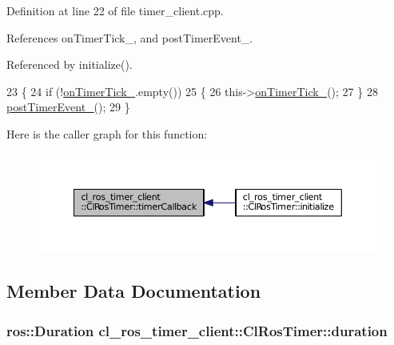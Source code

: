 Definition at line 22 of file timer\+\_\+client.\+cpp.



References on\+Timer\+Tick\+\_\+, and post\+Timer\+Event\+\_\+.



Referenced by initialize().


\begin{DoxyCode}
23 \{
24     \textcolor{keywordflow}{if} (!\hyperlink{classcl__ros__timer__client_1_1ClRosTimer_a2d37aff87ee978d4716966bf55d023b4}{onTimerTick\_}.empty())
25     \{
26         this->\hyperlink{classcl__ros__timer__client_1_1ClRosTimer_a2d37aff87ee978d4716966bf55d023b4}{onTimerTick\_}();
27     \}
28     \hyperlink{classcl__ros__timer__client_1_1ClRosTimer_a6fb47a4291370f5fefe61dd5123ed008}{postTimerEvent\_}();
29 \}
\end{DoxyCode}


Here is the caller graph for this function\+:
\nopagebreak
\begin{figure}[H]
\begin{center}
\leavevmode
\includegraphics[width=350pt]{classcl__ros__timer__client_1_1ClRosTimer_a1d1fd3574df7db302bcb3908d7ff15c8_icgraph}
\end{center}
\end{figure}




\subsection{Member Data Documentation}
\subsubsection[{\texorpdfstring{duration}{duration}}]{\setlength{\rightskip}{0pt plus 5cm}ros\+::\+Duration cl\+\_\+ros\+\_\+timer\+\_\+client\+::\+Cl\+Ros\+Timer\+::duration\hspace{0.3cm}{\ttfamily [protected]}}\hypertarget{classcl__ros__timer__client_1_1ClRosTimer_aa9936966e5547dc21f8a5e9b75efe36e}{}\label{classcl__ros__timer__client_1_1ClRosTimer_aa9936966e5547dc21f8a5e9b75efe36e}


